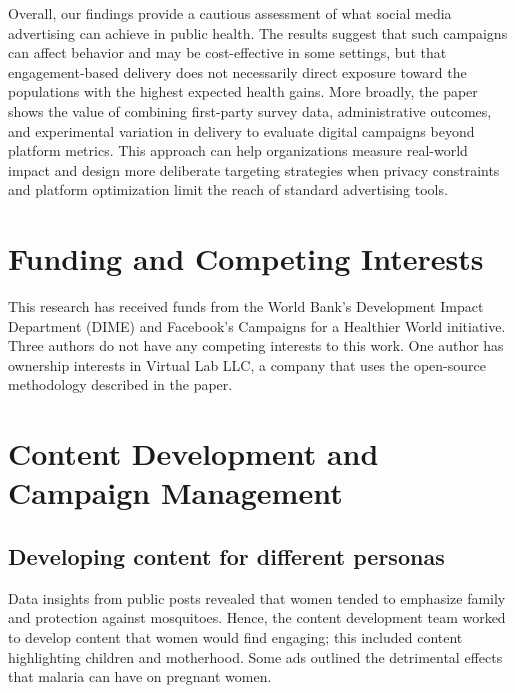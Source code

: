 Overall, our findings provide a cautious assessment of what social media advertising can achieve in public health. The results suggest that such campaigns can affect behavior and may be cost-effective in some settings, but that engagement-based delivery does not necessarily direct exposure toward the populations with the highest expected health gains. More broadly, the paper shows the value of combining first-party survey data, administrative outcomes, and experimental variation in delivery to evaluate digital campaigns beyond platform metrics. This approach can help organizations measure real-world impact and design more deliberate targeting strategies when privacy constraints and platform optimization limit the reach of standard advertising tools.

\section*{\normalsize Funding and Competing Interests}
\normalsize This research has received funds from the World Bank’s Development Impact Department (DIME) and Facebook’s Campaigns for a Healthier World initiative. Three authors do not have any competing interests to this work. One author has ownership interests in Virtual Lab LLC, a company that uses the open-source methodology described in the paper. 



%
%
%


\clearpage

\section{Content Development and Campaign Management}
\label{mal-appendix:A}
\setcounter{figure}{0}
\renewcommand{\thefigure}{A\arabic{figure}}
\renewcommand{\theHfigure}{A\arabic{figure}} %

\subsection{Developing content for different personas}
Data insights from public posts revealed that women tended to emphasize family and protection against mosquitoes. Hence, the content development team worked to develop content that women would find engaging; this included content highlighting children and motherhood. Some ads outlined the detrimental effects that malaria can have on pregnant women.

